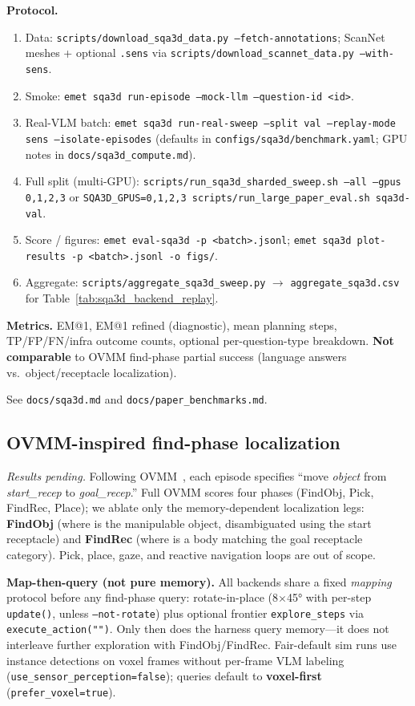 \textbf{Protocol.}
\begin{enumerate}
  \item Data: \texttt{scripts/download\_sqa3d\_data.py --fetch-annotations}; ScanNet meshes + optional \texttt{.sens} via \texttt{scripts/download\_scannet\_data.py --with-sens}.
  \item Smoke: \texttt{emet sqa3d run-episode --mock-llm --question-id <id>}.
  \item Real-VLM batch: \texttt{emet sqa3d run-real-sweep --split val --replay-mode sens --isolate-episodes} (defaults in \texttt{configs/sqa3d/benchmark.yaml}; GPU notes in \texttt{docs/sqa3d\_compute.md}).
  \item Full split (multi-GPU): \texttt{scripts/run\_sqa3d\_sharded\_sweep.sh --all --gpus 0,1,2,3} or \texttt{SQA3D\_GPUS=0,1,2,3 scripts/run\_large\_paper\_eval.sh sqa3d-val}.
  \item Score / figures: \texttt{emet eval-sqa3d -p <batch>.jsonl}; \texttt{emet sqa3d plot-results -p <batch>.jsonl -o figs/}.
  \item Aggregate: \texttt{scripts/aggregate\_sqa3d\_sweep.py} $\rightarrow$ \texttt{aggregate\_sqa3d.csv} for Table~\ref{tab:sqa3d_backend_replay}.
\end{enumerate}

\textbf{Metrics.}
EM@1, EM@1 refined (diagnostic), mean planning steps, TP/FP/FN/infra outcome counts, optional per-question-type breakdown.
\textbf{Not comparable} to OVMM find-phase partial success (language answers vs.\ object/receptacle localization).

See \texttt{docs/sqa3d.md} and \texttt{docs/paper\_benchmarks.md}.

\subsection{OVMM-inspired find-phase localization}
\label{sec:ovmm_find_phase}

\textit{Results pending.}
Following OVMM~\cite{ovmm2023}, each episode specifies ``move \emph{object} from \emph{start\_recep} to \emph{goal\_recep}.''
Full OVMM scores four phases (FindObj, Pick, FindRec, Place); we ablate only the memory-dependent localization legs:
\textbf{FindObj} (where is the manipulable object, disambiguated using the start receptacle) and
\textbf{FindRec} (where is a body matching the goal receptacle category).
Pick, place, gaze, and reactive navigation loops are out of scope.

\textbf{Map-then-query (not pure memory).}
All backends share a fixed \emph{mapping} protocol before any find-phase query:
rotate-in-place (8$\times$45° with per-step \texttt{update()}, unless \texttt{--not-rotate}) plus optional frontier \texttt{explore\_steps} via \texttt{execute\_action("")}.
Only then does the harness query memory---it does not interleave further exploration with FindObj/FindRec.
Fair-default sim runs use instance detections on voxel frames without per-frame VLM labeling (\texttt{use\_sensor\_perception=false}); queries default to \textbf{voxel-first} (\texttt{prefer\_voxel=true}).

